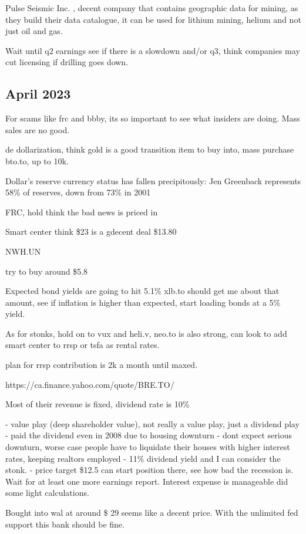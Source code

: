 Pulse Seismic Inc. , decent company that contains geographic data for mining, as they build their data catalogue, it can be used for lithium mining, helium and not just oil and gas.

Wait until q2 earnings see if there is a slowdown and/or q3, think companies may cut licensing if drilling goes down.
\subsection{April 2023}

For scams like frc and bbby, its so important to see what insiders are doing. Mass sales are no good.

de dollarization,   think gold is a good transition item to buy into, mass purchase bto.to, up to 10k.

Dollar’s reserve currency status has fallen precipitously: Jen
Greenback represents 58\% of reserves, down from 73\% in 2001


FRC, hold think the bad news is priced in

Smart center think \$23 is a gdecent deal
\$13.80

NWH.UN

try to buy around \$5.8

Expected bond yields are going to hit 5.1\%  xlb.to should get me about that amount, see if inflation is higher than expected, start loading bonds at a 5\% yield.

As for stonks, hold on to vux and heli.v, neo.to is also strong, can look to add smart center to rrsp or tsfa as rental rates.

plan for rrsp contribution is 2k a month until maxed.

https://ca.finance.yahoo.com/quote/BRE.TO/

Most of their revenue is fixed, dividend rate is 10\%

- value play (deep shareholder value), not really a value play, just a dividend play
- paid the dividend even in 2008 due to housing downturn
- dont expect serious downturn, worse case people have to liquidate their houses with higher interest rates, keeping realtors employed
- 11\% dividend yield and I can consider the stonk.
- price target \$12.5 can start position there, see how bad the recession is. Wait for at least one more earnings report. Interest expense is manageable did some light calculations.

Bought into wal at around \$ 29 seems like a decent price. With the unlimited fed support this bank should be fine.

